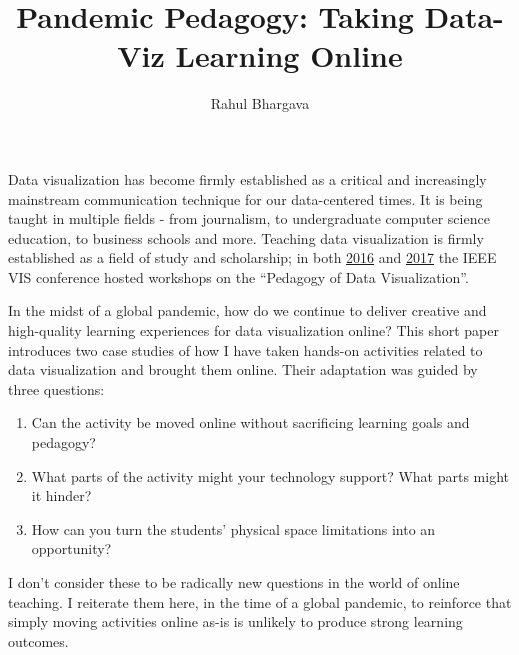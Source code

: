 \documentclass[journal]{vgtc}                %
\title{Pandemic Pedagogy: Taking Data-Viz Learning Online}
\author{Rahul Bhargava}
\begin{document}


\maketitle

Data visualization has become firmly established as a critical and increasingly mainstream communication technique for our data-centered times. It is being taught in multiple fields - from journalism\cite{gray_data_2012}, to undergraduate computer science education\cite{syeda_design_2020}, to business schools\cite{wolfe_teaching_2015} and more. Teaching data visualization is firmly established as a field of study and scholarship; in both \href{https://vgl.cs.usfca.edu/pdvw/2016/}{2016} and \href{https://vgl.cs.usfca.edu/pdvw/2017/}{2017} the IEEE VIS conference hosted workshops on the “Pedagogy of Data Visualization”.

In the midst of a global pandemic, how do we continue to deliver creative and high-quality learning experiences for data visualization online? This short paper introduces two case studies of how I have taken hands-on activities related to data visualization and brought them online. Their adaptation was guided by three questions:
\begin{enumerate}
  \itemsep0em 
  \item Can the activity be moved online without sacrificing learning goals and pedagogy?
  \item What parts of the activity might your technology support? What parts might it hinder?
  \item How can you turn the students’ physical space limitations into an opportunity?
\end{enumerate}
I don’t consider these to be radically new questions in the world of online  teaching. I reiterate them here, in the time of a global pandemic, to reinforce that simply moving activities online as-is is unlikely to produce strong learning outcomes.
\end{document}
